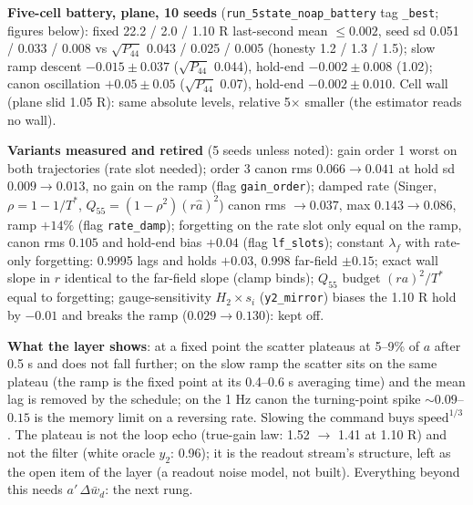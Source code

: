 \documentclass[11pt,a4paper]{ctexart}
\begin{document}
\textbf{Five-cell battery, plane, 10 seeds} (\texttt{run\_5state\_noap\_battery} tag \texttt{\_best}; figures below): fixed 22.2 / 2.0 / 1.10 R last-second mean $\le 0.002$, seed sd 0.051 / 0.033 / 0.008 vs $\sqrt{P_{44}}$ 0.043 / 0.025 / 0.005 (honesty 1.2 / 1.3 / 1.5); slow ramp descent $-0.015 \pm 0.037$ ($\sqrt{P_{44}}$ 0.044), hold-end $-0.002 \pm 0.008$ (1.02); canon oscillation $+0.05 \pm 0.05$ ($\sqrt{P_{44}}$ 0.07), hold-end $-0.002 \pm 0.010$. Cell wall (plane slid 1.05 R): same absolute levels, relative 5$\times$ smaller (the estimator reads no wall).

\textbf{Variants measured and retired} (5 seeds unless noted): gain order 1 worst on both trajectories (rate slot needed); order 3 canon rms $0.066 \to 0.041$ at hold sd $0.009 \to 0.013$, no gain on the ramp (flag \texttt{gain\_order}); damped rate (Singer, $\rho = 1 - 1/T^*$, $Q_{55} = (1-\rho^2)(r\hat a)^2$) canon rms $\to 0.037$, max $0.143 \to 0.086$, ramp $+14\%$ (flag \texttt{rate\_damp}); forgetting on the rate slot only equal on the ramp, canon rms $0.105$ and hold-end bias $+0.04$ (flag \texttt{lf\_slots}); constant $\lambda_f$ with rate-only forgetting: 0.9995 lags and holds $+0.03$, 0.998 far-field $\pm 0.15$; exact wall slope in $r$ identical to the far-field slope (clamp binds); $Q_{55}$ budget $(ra)^2/T^*$ equal to forgetting; gauge-sensitivity $H_2 \times s_i$ (\texttt{y2\_mirror}) biases the 1.10 R hold by $-0.01$ and breaks the ramp ($0.029 \to 0.130$): kept off.

\textbf{What the layer shows}: at a fixed point the scatter plateaus at 5--9\% of $a$ after 0.5 s and does not fall further; on the slow ramp the scatter sits on the same plateau (the ramp is the fixed point at its 0.4--0.6 s averaging time) and the mean lag is removed by the schedule; on the 1 Hz canon the turning-point spike $\sim 0.09$--$0.15$ is the memory limit on a reversing rate. Slowing the command buys $\text{speed}^{1/3}$. The plateau is not the loop echo (true-gain law: 1.52 $\to$ 1.41 at 1.10 R) and not the filter (white oracle $y_2$: 0.96); it is the readout stream's structure, left as the open item of the layer (a readout noise model, not built). Everything beyond this needs $a'\,\Delta\bar w_d$: the next rung.
\end{document}
